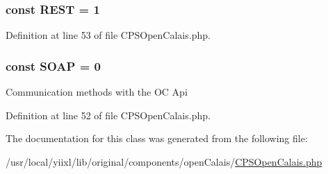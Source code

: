 \hypertarget{classCPSOpenCalais_a1273e4f6dfecad5cc711360770b7d784}{
\subsubsection[{REST}]{\setlength{\rightskip}{0pt plus 5cm}const {\bf REST} = 1}}
\label{classCPSOpenCalais_a1273e4f6dfecad5cc711360770b7d784}


Definition at line 53 of file CPSOpenCalais.php.

\hypertarget{classCPSOpenCalais_abd77e417d95ee59b739e54a62fe97fbc}{
\subsubsection[{SOAP}]{\setlength{\rightskip}{0pt plus 5cm}const {\bf SOAP} = 0}}
\label{classCPSOpenCalais_abd77e417d95ee59b739e54a62fe97fbc}
Communication methods with the OC Api 

Definition at line 52 of file CPSOpenCalais.php.



The documentation for this class was generated from the following file:\begin{DoxyCompactItemize}
\item 
/usr/local/yiixl/lib/original/components/openCalais/\hyperlink{CPSOpenCalais_8php}{CPSOpenCalais.php}\end{DoxyCompactItemize}
